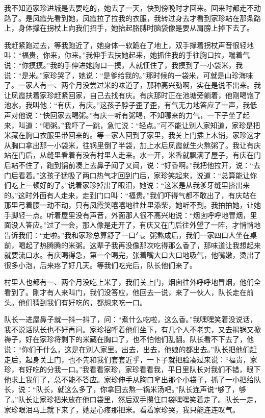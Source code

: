 \documentclass[12pt,UTF8]{ctexbook}
\begin{document}
我不知道家珍进城是去要吃的，她去了一天，快到傍晚时才回来。回来时都走不动路了。是凤霞先看到她，凤霞拉了拉我的衣服，我转过身去才看到家珍站在那条路上，身体撑在拐杖上向我们招手，她抬起胳膊时脑袋像是要从肩膀上掉下去了。

我赶紧跑过去，等我跑近了，她身体一软跪在了地上，双手撑着拐杖声音很轻地叫：“福贵，你来，你来。”我伸手去扶她起来，她抓住我的手往胸口拉，喘着气说：“你摸摸。”我的手伸进她胸口一摸，人就怔住了，我摸到了一小袋米，我说：“是米。”家珍哭了，她说：“是爹给我的。”那时候的一袋米，可就是山珍海味了。一家人有一、两个月没尝过米的味道了，那种高兴劲啊，实在是说不出来。我让凤霞扶着家珍赶紧回家，自己去找有庆。有庆那时正在池塘旁躺着，他刚喝饱了池水，我叫他：“有庆，有庆。”这孩子脖子歪了歪，有气无力地答应了一声，我低声对他说：“快回家去喝粥。”有庆一听有粥喝，不知哪来的力气，一下子坐了起来，叫道：“喝粥。”我吓了一跳，急忙说：“轻点。”可不能让别人家知道，家珍是把米藏在胸口衣服里带回来的。等一家人回到了家里，我关上门插上木销，家珍这才从胸口拿出那一小袋米，往锅里倒了半袋，加上水后凤霞就生火熬粥了。我让有庆站在门后，从缝里看着有没有村里人走来。水一开，米香就飘满了屋子，有庆在门后站不住了，跑到锅前凑上去鼻子闻了又闻，说：“好香啊。”我把他拉开，说：“去门后看着。”这孩子猛吸了两口热气才回到门后，家珍笑起来，说道：“总算能让你们吃上一顿好的了。”说着家珍掉出了眼泪，她说：“这米是从我爹牙缝里挤出来的。”这时外面有人走来，走到门口叫：“福贵。”我们吓得气都不敢出了，有庆站在那里弓着腰一动不动，只有凤霞笑嘻嘻地往灶里添柴，她听不到。我拍拍她，让她手脚轻一点。听着屋里没有声音，外面那人很不高兴地说：“烟囱呼呼地冒烟，里面没人答应。”过了一会，那人像是走开了，有庆又在门后往外望了一阵，才悄悄地告诉我们：“走啦。”我和家珍总算舒了一口气。粥熬成后，我们一家四口人坐在桌前，喝起了热腾腾的米粥。这辈子我再没像那次吃得那么香了，那味道让我想起来就要流口水。有庆喝得急，第一个喝完，张着嘴大口大口地吸气，他嘴嫩，烫出了很多小泡，后来疼了好几天。等我们吃完后，队长他们来了。

村里人也都有一、两个月没吃上米了，我们关上门，烟囱往外呼呼地冒烟，他们全看到了。刚才有人来叫门，我们没答应，他回去一说，来了一伙人，队长走在前头。他们猜到我们有好吃的，都想来吃一口。

队长一进屋鼻子就一抖一抖了，问：“煮什么吃啦，这么香。”我嘿嘿笑着没说话，我不说话队长也不好再问。家珍招呼着他们坐下，有几个人不老实，又去揭锅又掀褥子，好在家珍将剩下的米藏在胸口了，也不怕他们乱翻。队长看不下去了，他说：“你们干什么，这是在别人家里。出去，出去，他娘的都出去。”队长把他们赶走后，起身关上门，也不先和我们套套近乎，一下子就把脸凑过来说：“福贵，家珍，有好吃的分我一口。”我看看家珍，家珍看看我，平日里队长对我们不错，眼下他求上我们了，总不能不答应。家珍伸手从胸口拿出那个小袋子，抓了一小把给队长，说：“队长，就这么多了，你拿回去熬一锅米汤吧。”队长连声说“够了，够了。”队长让家珍把米放在他口袋里，然后双手攥住口袋嘿嘿笑着走了。队长一走，家珍眼泪马上就下来了，她是心疼那把米。看着家珍哭，我只能连连叹气。
\end{document}
